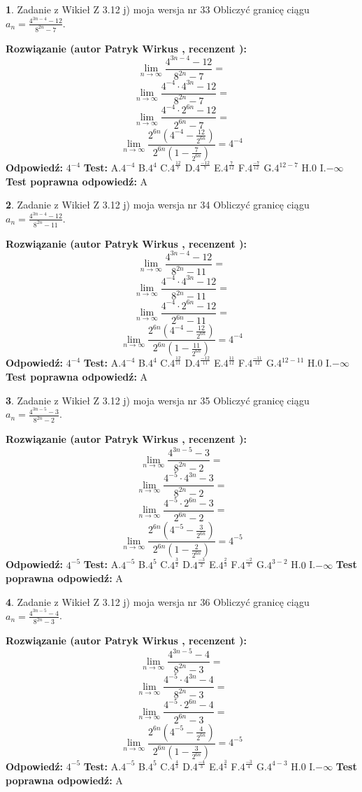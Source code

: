 \documentclass[12pt, a4paper]{article}
\theoremstyle{definition} %
\newtheorem{zad}{}
\newcommand{\zadStart}[1]{\begin{zad}#1\newline}
\newcommand{\zadStop}{\end{zad}}
\newcommand{\rozwStart}[2]{\noindent \textbf{Rozwiązanie (autor #1 , recenzent #2): }\newline}
\newcommand{\rozwStop}{\newline}
\newcommand{\odpStart}{\noindent \textbf{Odpowiedź:}\newline}
\newcommand{\odpStop}{\newline}
\newcommand{\testStart}{\noindent \textbf{Test:}\newline}
\newcommand{\testStop}{\newline}
\newcommand{\kluczStart}{\noindent \textbf{Test poprawna odpowiedź:}\newline}
\newcommand{\kluczStop}{\newline}
\begin{document}
\zadStart{Zadanie z Wikieł Z 3.12 j) moja wersja nr 33}
Obliczyć granicę ciągu $a_{n}=\frac{4^{3n-4}-12}{8^{2n}-7}$.
\zadStop
\rozwStart{Patryk Wirkus}{}
$$\lim\limits_{n\to\infty}\frac{4^{3n-4}-12}{8^{2n}-7}=$$
$$\lim\limits_{n\to\infty}\frac{4^{-4} \cdot 4^{3n}-12}{8^{2n}-7}=$$
$$\lim\limits_{n\to\infty}\frac{4^{-4} \cdot 2^{6n}-12}{2^{6n}-7}=$$
$$\lim\limits_{n\to\infty}\frac{2^{6n}(4^{-4} - \frac{12}{2^{6n}})}{2^{6n}(1-\frac{7}{2^{6n}})}= 4^{-4}$$
\rozwStop
\odpStart
$4^{-4}$
\odpStop
\testStart
A.$4^{-4}$
B.$4^{4}$
C.$4^{\frac{12}{7}}$
D.$4^{\frac{-12}{7}}$
E.$4^{\frac{7}{12}}$
F.$4^{\frac{-7}{12}}$
G.$4^{12-7}$
H.$0$
I.$-\infty$
\testStop
\kluczStart
A
\kluczStop



\zadStart{Zadanie z Wikieł Z 3.12 j) moja wersja nr 34}
Obliczyć granicę ciągu $a_{n}=\frac{4^{3n-4}-12}{8^{2n}-11}$.
\zadStop
\rozwStart{Patryk Wirkus}{}
$$\lim\limits_{n\to\infty}\frac{4^{3n-4}-12}{8^{2n}-11}=$$
$$\lim\limits_{n\to\infty}\frac{4^{-4} \cdot 4^{3n}-12}{8^{2n}-11}=$$
$$\lim\limits_{n\to\infty}\frac{4^{-4} \cdot 2^{6n}-12}{2^{6n}-11}=$$
$$\lim\limits_{n\to\infty}\frac{2^{6n}(4^{-4} - \frac{12}{2^{6n}})}{2^{6n}(1-\frac{11}{2^{6n}})}= 4^{-4}$$
\rozwStop
\odpStart
$4^{-4}$
\odpStop
\testStart
A.$4^{-4}$
B.$4^{4}$
C.$4^{\frac{12}{11}}$
D.$4^{\frac{-12}{11}}$
E.$4^{\frac{11}{12}}$
F.$4^{\frac{-11}{12}}$
G.$4^{12-11}$
H.$0$
I.$-\infty$
\testStop
\kluczStart
A
\kluczStop



\zadStart{Zadanie z Wikieł Z 3.12 j) moja wersja nr 35}
Obliczyć granicę ciągu $a_{n}=\frac{4^{3n-5}-3}{8^{2n}-2}$.
\zadStop
\rozwStart{Patryk Wirkus}{}
$$\lim\limits_{n\to\infty}\frac{4^{3n-5}-3}{8^{2n}-2}=$$
$$\lim\limits_{n\to\infty}\frac{4^{-5} \cdot 4^{3n}-3}{8^{2n}-2}=$$
$$\lim\limits_{n\to\infty}\frac{4^{-5} \cdot 2^{6n}-3}{2^{6n}-2}=$$
$$\lim\limits_{n\to\infty}\frac{2^{6n}(4^{-5} - \frac{3}{2^{6n}})}{2^{6n}(1-\frac{2}{2^{6n}})}= 4^{-5}$$
\rozwStop
\odpStart
$4^{-5}$
\odpStop
\testStart
A.$4^{-5}$
B.$4^{5}$
C.$4^{\frac{3}{2}}$
D.$4^{\frac{-3}{2}}$
E.$4^{\frac{2}{3}}$
F.$4^{\frac{-2}{3}}$
G.$4^{3-2}$
H.$0$
I.$-\infty$
\testStop
\kluczStart
A
\kluczStop



\zadStart{Zadanie z Wikieł Z 3.12 j) moja wersja nr 36}
Obliczyć granicę ciągu $a_{n}=\frac{4^{3n-5}-4}{8^{2n}-3}$.
\zadStop
\rozwStart{Patryk Wirkus}{}
$$\lim\limits_{n\to\infty}\frac{4^{3n-5}-4}{8^{2n}-3}=$$
$$\lim\limits_{n\to\infty}\frac{4^{-5} \cdot 4^{3n}-4}{8^{2n}-3}=$$
$$\lim\limits_{n\to\infty}\frac{4^{-5} \cdot 2^{6n}-4}{2^{6n}-3}=$$
$$\lim\limits_{n\to\infty}\frac{2^{6n}(4^{-5} - \frac{4}{2^{6n}})}{2^{6n}(1-\frac{3}{2^{6n}})}= 4^{-5}$$
\rozwStop
\odpStart
$4^{-5}$
\odpStop
\testStart
A.$4^{-5}$
B.$4^{5}$
C.$4^{\frac{4}{3}}$
D.$4^{\frac{-4}{3}}$
E.$4^{\frac{3}{4}}$
F.$4^{\frac{-3}{4}}$
G.$4^{4-3}$
H.$0$
I.$-\infty$
\testStop
\kluczStart
A
\kluczStop
\end{document}
